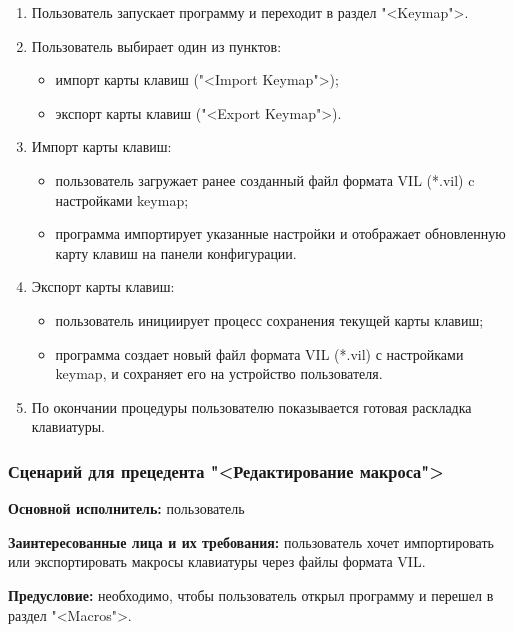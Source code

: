 \begin{enumerate}
\item Пользователь запускает программу и переходит в раздел "<Keymap">.
\item Пользователь выбирает один из пунктов:

\begin{itemize}
	\item импорт карты клавиш ("<Import Keymap">);
	\item экспорт карты клавиш ("<Export Keymap">).
\end{itemize}

\item[3.1.] Импорт карты клавиш:

\begin{itemize}
	\item пользователь загружает ранее созданный файл формата VIL (*.vil) c настройками keymap;
	\item программа импортирует указанные настройки и отображает обновленную карту клавиш на панели конфигурации.
\end{itemize}

\item[3.2.] Экспорт карты клавиш:

\begin{itemize}
	\item пользователь инициирует процесс сохранения текущей карты клавиш;
	\item программа создает новый файл формата VIL (*.vil) с настройками keymap, и сохраняет его на устройство пользователя.
\end{itemize}

\item[4.] По окончании процедуры пользователю показывается готовая раскладка клавиатуры.
\end{enumerate}

\subsubsection{Сценарий для прецедента "<Редактирование макроса">}

\textbf{Основной исполнитель:} пользователь

\textbf{Заинтересованные лица и их требования:} пользователь хочет импортировать или экспортировать макросы клавиатуры через файлы формата VIL.

\textbf{Предусловие:} необходимо, чтобы пользователь открыл программу и перешел в раздел "<Macros">.

